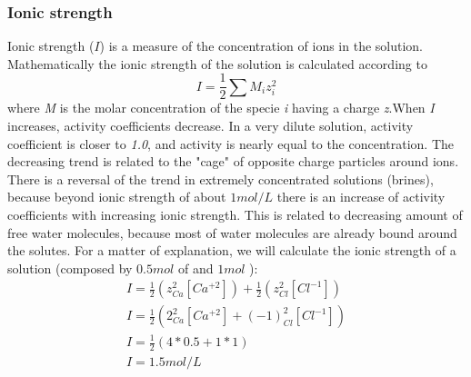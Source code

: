 \subsubsection{Ionic strength}
Ionic strength ($I$) is a measure of the concentration of ions in the solution.  Mathematically the ionic strength of the solution is calculated according to
\begin{equation} \label{eq:ionicStrength}
I = \frac{1}{2} \sum{M_i z_i^2}
\end{equation}
where \emph{M} is the molar concentration of the specie \emph{i} having a charge \emph{z}.When \emph{I} increases, activity coefficients decrease. In a very dilute solution, activity coefficient is closer to \emph{1.0}, and activity is nearly equal to the concentration. The decreasing trend is related to the "cage" of opposite charge particles around ions. There is a reversal of the trend in extremely concentrated solutions (brines), because beyond ionic strength of about $1 mol/L$ there is an increase of activity coefficients with increasing ionic strength. This is related to decreasing amount of free water molecules, because most of water molecules are already bound around the solutes.
For a matter of explanation, we will calculate the ionic strength of a  solution (composed by $0.5 mol$ of  and $1 mol$ ):
\begin{eqnarray}
I = \frac{1}{2}  (z^2_{Ca}[Ca^{+2}]) + \frac{1}{2}  (z^2_{Cl}[Cl^{-1}]) \\
I = \frac{1}{2}  (2^2_{Ca}[Ca^{+2}] +  (-1)^2_{Cl}[Cl^{-1}]) \\
I = \frac{1}{2} (4 * 0.5 + 1 * 1) \\
I = 1.5 mol/L
\end{eqnarray}


